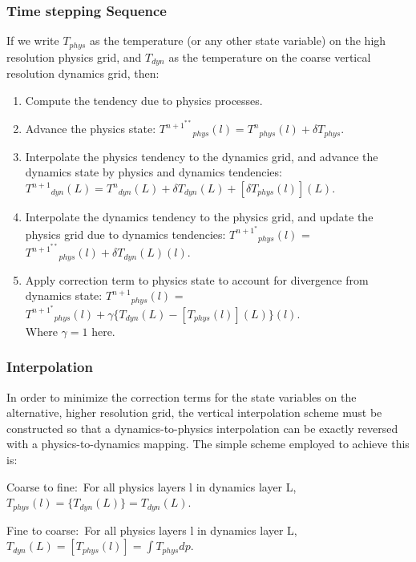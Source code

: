 \subsubsection{Time stepping Sequence}
If we write $T_{phys}$ as the temperature (or any other state variable) on the high
resolution physics grid, and $T_{dyn}$ as the temperature on the coarse vertical resolution
dynamics grid, then:

\begin{enumerate}

\item{Compute the tendency due to physics processes.}

\item{Advance the physics state: ${T^{n+1}^{**}}_{phys}(l) = {T^n}_{phys}(l) + \delta T_{phys}$.}

\item{Interpolate the physics tendency to the dynamics grid, and advance the dynamics
state by physics and dynamics tendencies:
${T^{n+1}}_{dyn}(L) = {T^n}_{dyn}(L) + \delta T_{dyn}(L) + [\delta T _{phys}(l)](L)$.}

\item{Interpolate the dynamics tendency to the physics grid, and update the physics
grid due to dynamics tendencies: 
${T^{n+1}^*}_{phys}(l)$ = ${T^{n+1}^{**}}_{phys}(l) + {\delta T_{dyn}(L)}(l)$.}

\item{Apply correction term to physics state to account for divergence from dynamics state:
${T^{n+1}}_{phys}(l)$ = ${T^{n+1}^*}_{phys}(l) + \gamma \{  T_{dyn}(L) - [T_{phys}(l)](L) \}(l)$.} \\
Where $\gamma=1$ here. 

\end{enumerate}

\subsubsection{Interpolation}
In order to minimize the correction terms for the state variables on the alternative,
higher resolution grid, the vertical interpolation scheme must be constructed so that
a dynamics-to-physics interpolation can be exactly reversed with a physics-to-dynamics mapping.
The simple scheme employed to achieve this is:

Coarse to fine:\
For all physics layers l in dynamics layer L, $ T_{phys}(l) = \{T_{dyn}(L)\} = T_{dyn}(L) $.

Fine to coarse:\
For all physics layers l in dynamics layer L, $T_{dyn}(L) = [T_{phys}(l)] = \int{T_{phys} dp } $.

